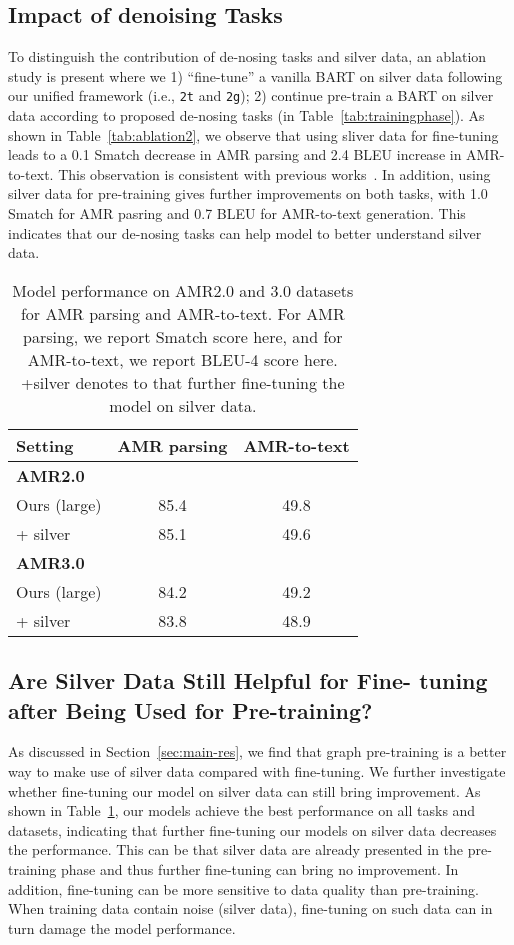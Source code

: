 \documentclass[11pt]{article}
\begin{document}
\subsection{Impact of denoising Tasks}\label{appendix:denoising}
To distinguish the contribution of de-nosing tasks and silver data, an ablation study is present where we 1) ``fine-tune'' a vanilla BART on silver data following our unified framework (i.e., \texttt{2t} and \texttt{2g}); 2) continue pre-train a BART on silver data according to proposed de-nosing tasks (in Table~\ref{tab:trainingphase}).
As shown in Table~\ref{tab:ablation2}, we observe that using sliver data for fine-tuning leads to a 0.1 Smatch decrease in AMR parsing and 2.4 BLEU increase in AMR-to-text. 
This observation is consistent with previous works~\cite{konstas2017neural,song2018graph,Bevilacqua_Blloshmi_Navigli_2021}.
In addition, using silver data for pre-training gives further improvements on both tasks, with 1.0 Smatch for AMR pasring and 0.7 BLEU for AMR-to-text generation.
This indicates that our de-nosing tasks can help model to better understand silver data. 


\begin{table}[!t]
	\centering
	\small
	\begin{tabular}{lcc}
		\toprule
        \textbf{Setting} & AMR parsing & AMR-to-text \\
		\midrule 	
		\textbf{AMR2.0} & &\\
		Ours (large)& 85.4 & 49.8 \\
		\quad + silver  & 85.1 & 49.6 \\
		\midrule 	
		\textbf{AMR3.0} & &\\
		Ours (large)& 84.2 & 49.2 \\
		\quad + silver  & 83.8 & 48.9 \\
	\bottomrule
	\end{tabular}
	\caption{Model performance on AMR2.0 and 3.0 datasets for AMR parsing and AMR-to-text. For AMR parsing, we report Smatch score here, and for AMR-to-text, we report BLEU-4 score here. +silver denotes to that further fine-tuning the model on silver data.}
	\label{tab:silverdata}
\end{table}

\subsection{Are Silver Data Still Helpful for Fine- tuning after Being Used for Pre-training?}\label{appendix:silverdata}

As discussed in Section~\ref{sec:main-res}, we find that graph pre-training is a better way to make use of silver data compared with fine-tuning.
We further investigate whether fine-tuning our model on silver data can still bring improvement.
As shown in Table~\ref{tab:silverdata}, our models achieve the best performance on all tasks and datasets, indicating that further fine-tuning our models on silver data decreases the performance.
This can be that silver data are already presented in the pre-training phase and thus further fine-tuning can bring no improvement.
In addition, fine-tuning can be more sensitive to data quality than pre-training.
When training data contain noise (silver data), fine-tuning on such data can in turn damage the model performance.
\end{document}
